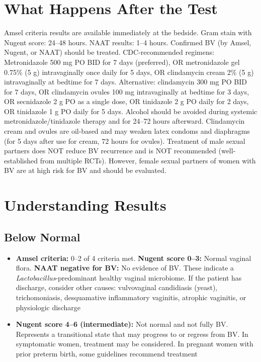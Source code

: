 \section*{What Happens After the Test}
Amsel criteria results are available immediately at the bedside. Gram stain with Nugent score: 24--48 hours. NAAT results: 1--4 hours. Confirmed BV (by Amsel, Nugent, or NAAT) should be treated. CDC-recommended regimens: Metronidazole 500 mg PO BID for 7 days (preferred), OR metronidazole gel 0.75\% (5 g) intravaginally once daily for 5 days, OR clindamycin cream 2\% (5 g) intravaginally at bedtime for 7 days. Alternative: clindamycin 300 mg PO BID for 7 days, OR clindamycin ovules 100 mg intravaginally at bedtime for 3 days, OR secnidazole 2 g PO as a single dose, OR tinidazole 2 g PO daily for 2 days, OR tinidazole 1 g PO daily for 5 days. Alcohol should be avoided during systemic metronidazole/tinidazole therapy and for 24--72 hours afterward. Clindamycin cream and ovules are oil-based and may weaken latex condoms and diaphragms (for 5 days after use for cream, 72 hours for ovules). Treatment of male sexual partners does NOT reduce BV recurrence and is NOT recommended (well-established from multiple RCTs). However, female sexual partners of women with BV are at high risk for BV and should be evaluated.

\section*{Understanding Results}

\subsection*{Below Normal}
\begin{itemize}
  \item \textbf{Amsel criteria:} 0--2 of 4 criteria met. \textbf{Nugent score 0--3:} Normal vaginal flora. \textbf{NAAT negative for BV:} No evidence of BV. These indicate a \textit{Lactobacillus}-predominant healthy vaginal microbiome. If the patient has discharge, consider other causes: vulvovaginal candidiasis (yeast), trichomoniasis, desquamative inflammatory vaginitis, atrophic vaginitis, or physiologic discharge
  \item \textbf{Nugent score 4--6 (intermediate):} Not normal and not fully BV. Represents a transitional state that may progress to or regress from BV. In symptomatic women, treatment may be considered. In pregnant women with prior preterm birth, some guidelines recommend treatment
\end{itemize}

